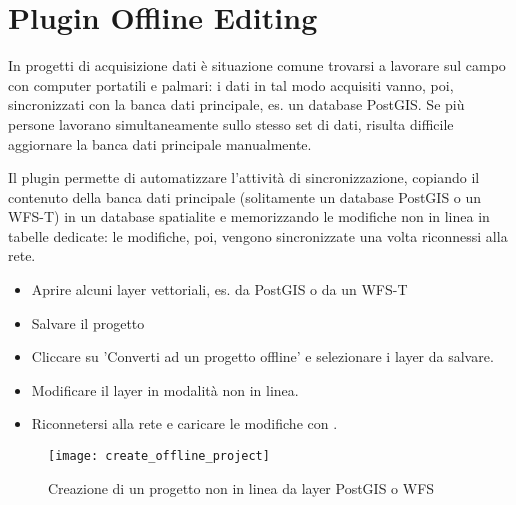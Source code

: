 
\section{Plugin Offline Editing}\label{sec:offlinedit}


In progetti di acquisizione dati è situazione comune trovarsi a lavorare sul 
campo con computer portatili e palmari: i dati in tal modo acquisiti vanno, poi, 
sincronizzati con la banca dati principale, es. un database PostGIS.
Se più persone lavorano simultaneamente sullo stesso set di dati, risulta 
difficile aggiornare la banca dati principale manualmente.

Il plugin  permette di automatizzare 
l'attività di sincronizzazione, copiando il contenuto della banca dati principale 
(solitamente un database PostGIS o un WFS-T) in un database spatialite e memorizzando 
le modifiche non in linea in tabelle dedicate: le modifiche, poi, vengono sincronizzate una 
volta riconnessi alla rete.


\begin{itemize}
\item Aprire alcuni layer vettoriali, es. da PostGIS o da un WFS-T
\item Salvare il progetto
\item Cliccare su 'Converti ad un progetto offline' e selezionare i layer da salvare. 
\item Modificare il layer in modalità non in linea.
\item Riconnetersi alla rete e caricare le modifiche con .
\end{itemize}

\begin{figure}[ht]
   \centering
   \texttt{[image: create\_offline\_project]}   
   \caption{Creazione di un progetto non in linea da layer PostGIS o WFS \wincaption}
   \label{fig:offlineproject}
\end{figure}

\FloatBarrier
